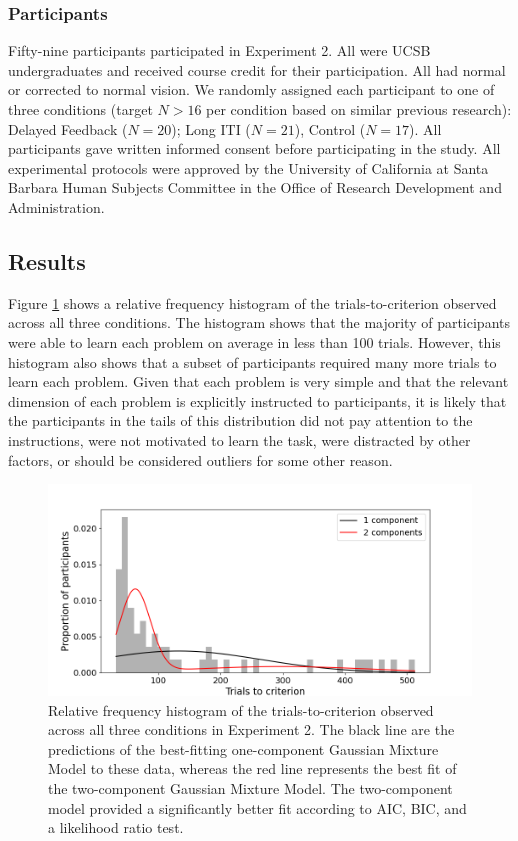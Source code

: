 \documentclass[doc, floatsintext]{apa7}
\begin{document}
\subsubsection{Participants}
Fifty-nine participants participated in Experiment 2. All
were UCSB undergraduates and received course credit for
their participation. All had normal or corrected to normal
vision. We randomly assigned each participant to one of
three conditions (target $N>16$ per condition based on
similar previous research): Delayed Feedback ($N = 20$);
Long ITI ($N = 21$), Control ($ N = 17$). All participants
gave written informed consent before participating in the
study. All experimental protocols were approved by the
University of California at Santa Barbara Human Subjects
Committee in the Office of Research Development and
Administration.

\subsection{Results}
Figure \ref{fig_gmm_hist_1} shows a relative frequency
histogram of the trials-to-criterion observed across all
three conditions. The histogram shows that the majority of
participants were able to learn each problem on average in
less than 100 trials. However, this histogram also shows
that a subset of participants required many more trials to
learn each problem. Given that each problem is very simple
and that the relevant dimension of each problem is
explicitly instructed to participants, it is likely that the
participants in the tails of this distribution did not pay
attention to the instructions, were not motivated to learn
the task, were distracted by other factors, or should be
considered outliers for some other reason. 

\begin{figure}
  \centering
  \includegraphics[width=.8\textwidth]{../figures/fig_exp_1_gmm.png}
  \caption{
      Relative frequency histogram of the
      trials-to-criterion observed across all three
      conditions in Experiment 2. The black line are the
      predictions of the best-fitting one-component Gaussian
      Mixture Model to these data, whereas the red line
      represents the best fit of the two-component Gaussian
      Mixture Model. The two-component model provided a
      significantly better fit according to AIC, BIC, and a
      likelihood ratio test.
}
  \label{fig_gmm_hist_1}
\end{figure}
\end{document}
